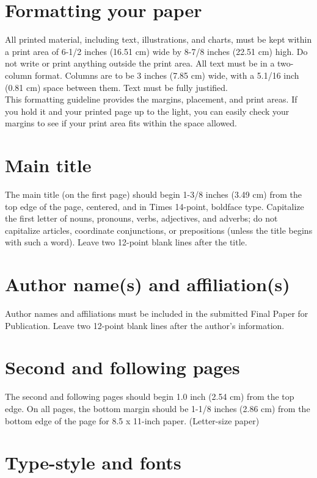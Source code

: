 \documentclass[10pt]{article}
\begin{document}
\section{Formatting your paper}

All printed material, including text, illustrations, and charts, must be kept within a print area of 6-1/2 inches (16.51 cm) wide by 8-7/8 inches (22.51 cm) high. Do not write or print anything outside the print area. All text must be in a two-column format. Columns are to be 3 inches (7.85 cm) wide, with a 5.1/16 inch (0.81 cm) space between them. Text must be fully justified. \\
This formatting guideline provides the margins, placement, and print areas. If you hold it and your printed page up to the light, you can easily check your margins to see if your print area fits within the space allowed.

\section{Main title}

The main title (on the first page) should begin 1-3/8 inches (3.49 cm) from the top edge of the page, centered, and in Times 14-point, boldface type. Capitalize the first letter of nouns, pronouns, verbs, adjectives, and adverbs; do not capitalize articles, coordinate conjunctions, or prepositions (unless the title begins with such a word). Leave two 12-point blank lines after the title.

\section{Author name(s) and affiliation(s) }

Author names and affiliations must be included in the submitted Final Paper for Publication. Leave two 12-point blank lines after the author’s information.

\section{Second and following pages}
\label{sect:pdf}

The second and following pages should begin 1.0 inch (2.54 cm) from the top edge. On all pages, the bottom margin should be 1-1/8 inches (2.86 cm) from the bottom edge of the page for 8.5 x 11-inch paper. (Letter-size paper)

\section{Type-style and fonts}
\label{sec:type-style}
\end{document}
